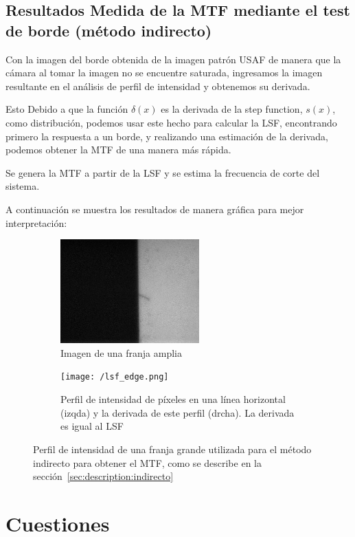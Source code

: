 \documentclass{./packages/optica-article}
\begin{document}
\subsection{Resultados Medida de la MTF mediante el test de borde (método indirecto)}\label{sec:resultados:indirecto}
Con la imagen del borde obtenida de la imagen patrón USAF de manera que la cámara al tomar la imagen no se encuentre saturada, ingresamos la imagen resultante en el análisis de perfil de intensidad y obtenemos su derivada.

Esto Debido a que la función $\delta(x)$ es la derivada de la step function, $s(x)$, como distribución, podemos usar este hecho para calcular la LSF, encontrando primero la respuesta a un borde, y realizando una estimación de la derivada, podemos obtener la MTF de una manera más rápida.

Se genera la MTF a partir de la LSF y se estima la frecuencia de corte del sistema.

A continuación se muestra los resultados de manera gráfica para mejor interpretación:
\begin{figure}[hptb]
	\centering
	\begin{subfigure}[t]{0.35\textwidth}
		\centering
		\includegraphics[height=4cm]{edge_large_line}
		\caption{Imagen de una franja amplia}\label{fig:perfil:img}
	\end{subfigure}
	\quad
	\begin{subfigure}[t]{0.60\textwidth}
		\centering
		\texttt{[image: /lsf\_edge.png]}
		\caption{Perfil de intensidad de píxeles en una línea horizontal (izqda) y la derivada de este perfil (drcha). La derivada es igual al LSF}\label{fig:perfil:graph}
	\end{subfigure}
	\caption{Perfil de intensidad de una franja grande utilizada para el método indirecto para obtener el MTF, como se describe en la sección~\ref{sec:description:indirecto}}\label{fig:perfil}
\end{figure}

\section{Cuestiones}
\end{document}
